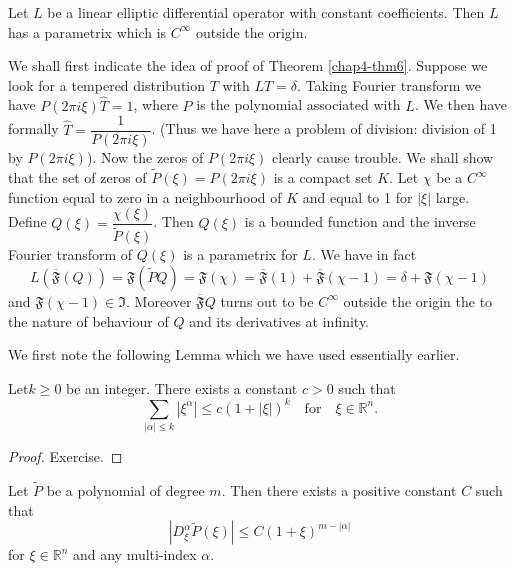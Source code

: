 \begin{theorem}\label{chap4-thm6}
Let $L$ be a linear elliptic differential operator with constant coefficients. Then $L$ has a parametrix which is $C^{\infty}$ outside the origin.
\end{theorem}

We shall first indicate the idea of proof of Theorem \ref{chap4-thm6}. Suppose we look for a tempered distribution $T$ with $LT=\delta$. Taking Fourier transform we have $P(2\pi i \xi)\widehat{T}=1$, where $P$ is the polynomial associated with $L$. We then have formally $\widehat{T}=\dfrac{1}{P(2\pi i\xi)}$. (Thus we have here a problem of division: division of 1 by $P(2\pi i\xi)$). Now the zeros of $P(2\pi i\xi)$ clearly cause trouble. We shall show that the set of zeros of $\widetilde{P}(\xi)=P(2\pi i\xi)$ is a compact set $K$. Let $\chi$ be a $C^{\infty}$ function equal to zero in a neighbourhood of $K$ and equal to 1 for $|\xi|$ large. Define $Q(\xi)=\dfrac{\chi(\xi)}{\widetilde{P}(\xi)}$. Then $Q(\xi)$ is a bounded function and the inverse Fourier transform of $Q(\xi)$ is a parametrix for $L$. We have in fact
$$
L(\overline{\mathfrak{F}}(Q))=\mathfrak{F}(\widetilde{P}Q)=\mathfrak{F}(\chi)=\overline{\mathfrak{F}}(1)+\overline{\mathfrak{F}}(\chi-1)=\delta+\mathfrak{F}(\chi-1)
$$
and $\mathfrak{F}(\chi-1)\in \mathfrak{I}$. Moreover $\overline{\mathfrak{F}}Q$ turns out to be $C^{\infty}$ outside the origin the to the nature of behaviour of $Q$ and its derivatives at infinity.

We first note the following Lemma which we have used essentially earlier. 

\setcounter{lemma}{0}
\begin{lemma}\label{chap4-add-lem1}
Let\pageoriginale $k\geq 0$ be an integer. There exists a constant $c>0$ such that
$$
\sum\limits_{|\alpha|\leq k}|\xi^{\alpha}|\leq c(1+|\xi|)^{k}\quad\text{for}\quad \xi\in \mathbb{R}^{n}.
$$
\end{lemma}

\begin{proof}
Exercise.
\end{proof}

\begin{lemma}\label{chap4-add-lem2}
Let $\widetilde{P}$ be a polynomial of degree $m$. Then there exists a positive constant $C$ such that
$$
|D^{\alpha}_{\xi}\widetilde{P}(\xi)|\leq C(1+\xi)^{m-|\alpha|}
$$
for $\xi\in \mathbb{R}^{n}$ and any multi-index $\alpha$.
\end{lemma}

